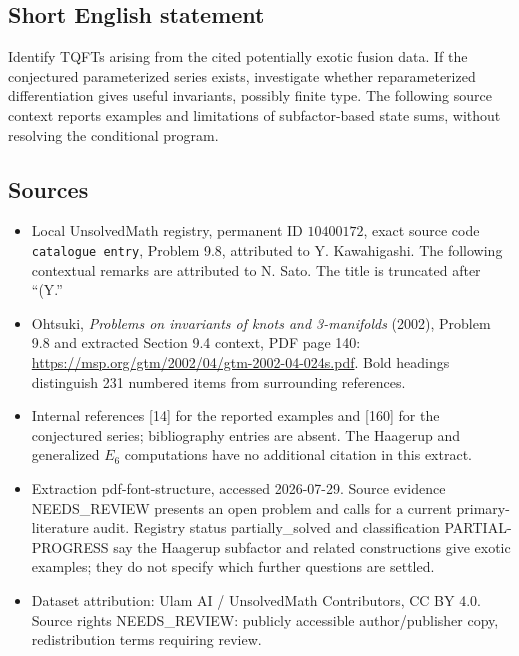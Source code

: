 \documentclass[11pt]{article}
\begin{document}
\subsection{Short English statement}
Identify TQFTs arising from the cited potentially exotic fusion data. If the conjectured parameterized series exists, investigate whether reparameterized differentiation gives useful invariants, possibly finite type. The following source context reports examples and limitations of subfactor-based state sums, without resolving the conditional program.
\subsection{Sources}
\begin{itemize}
\item Local UnsolvedMath registry, permanent ID \(10400172\), exact source code \texttt{catalogue entry}, Problem 9.8, attributed to Y. Kawahigashi. The following contextual remarks are attributed to N. Sato. The title is truncated after ``(Y.''
\item Ohtsuki, \emph{Problems on invariants of knots and 3-manifolds} (2002), Problem 9.8 and extracted Section 9.4 context, PDF page 140: \url{https://msp.org/gtm/2002/04/gtm-2002-04-024s.pdf}. Bold headings distinguish 231 numbered items from surrounding references.
\item Internal references [14] for the reported examples and [160] for the conjectured series; bibliography entries are absent. The Haagerup and generalized \(E_6\) computations have no additional citation in this extract.
\item Extraction pdf-font-structure, accessed 2026-07-29. Source evidence NEEDS\_REVIEW presents an open problem and calls for a current primary-literature audit. Registry status partially\_solved and classification PARTIAL-PROGRESS say the Haagerup subfactor and related constructions give exotic examples; they do not specify which further questions are settled.
\item Dataset attribution: Ulam AI / UnsolvedMath Contributors, CC BY 4.0. Source rights NEEDS\_REVIEW: publicly accessible author/publisher copy, redistribution terms requiring review.
\end{itemize}
\end{document}
